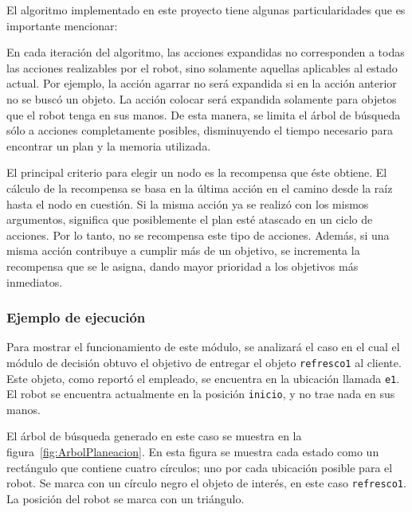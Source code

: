 \documentclass[11pt]{article}
\begin{document}
El algoritmo implementado en este proyecto tiene algunas particularidades que es importante mencionar:

En cada iteración del algoritmo, las acciones expandidas no corresponden a todas las acciones realizables por el robot, sino solamente aquellas aplicables al estado actual. Por ejemplo, la acción agarrar no será expandida si en la acción anterior no se buscó un objeto. La acción colocar será expandida solamente para objetos que el robot tenga en sus manos. De esta manera, se limita el árbol de búsqueda sólo a acciones completamente posibles, disminuyendo el tiempo necesario para encontrar un plan y la memoria utilizada.

El principal criterio para elegir un nodo es la recompensa que éste obtiene. El cálculo de la recompensa se basa en la última acción en el camino desde la raíz hasta el nodo en cuestión. Si la misma acción ya se realizó con los mismos argumentos, significa que posiblemente el plan esté atascado en un ciclo de acciones. Por lo tanto, no se recompensa este tipo de acciones. Además, si una misma acción contribuye a cumplir más de un objetivo, se incrementa la recompensa que se le asigna, dando mayor prioridad a los objetivos más inmediatos.

\subsubsection{Ejemplo de ejecución}

Para mostrar el funcionamiento de este módulo, se analizará el caso en el cual el módulo de decisión obtuvo el objetivo de entregar el objeto \texttt{refresco1} al cliente. Este objeto, como reportó el empleado, se encuentra en la ubicación llamada \texttt{e1}. El robot se encuentra actualmente en la posición \texttt{inicio}, y no trae nada en sus manos.

El árbol de búsqueda generado en este caso se muestra en la figura~\ref{fig:ArbolPlaneacion}. En esta figura se muestra cada estado como un rectángulo que contiene cuatro círculos; uno por cada ubicación posible para el robot. Se marca con un círculo negro el objeto de interés, en este caso \texttt{refresco1}. La posición del robot se marca con un triángulo.
\end{document}
